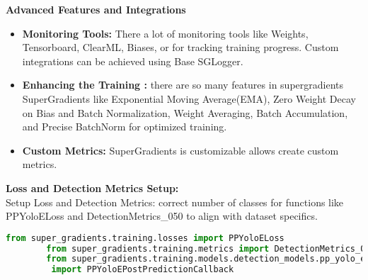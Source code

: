 \begin{enumerate}
    \textbf{Advanced Features and Integrations}\\
    \begin{itemize}
        \item \textbf{Monitoring Tools: } There a lot of monitoring tools like Weights, Tensorboard,   ClearML, Biases, or for tracking training progress. Custom integrations can be achieved using Base SGLogger.
        \item \textbf{Enhancing the Training : } there are so many features in supergradients SuperGradients like Exponential Moving Average(EMA), Zero Weight Decay on Bias and Batch Normalization, Weight Averaging, Batch Accumulation, and Precise BatchNorm for optimized training.
        \item \textbf{Custom Metrics: } SuperGradients is customizable allows create custom metrics.
    \end{itemize}
    
    \textbf{Loss and Detection Metrics Setup: }\\
   Setup Loss and Detection Metrics: 
 correct number of classes for functions like PPYoloELoss and DetectionMetrics\_050 to align with dataset specifics.
    
    \begin{lstlisting}[language=Python]
        from super_gradients.training.losses import PPYoloELoss
        from super_gradients.training.metrics import DetectionMetrics_050
        from super_gradients.training.models.detection_models.pp_yolo_e 
         import PPYoloEPostPredictionCallback
        

\end{lstlisting}
\end{enumerate}
